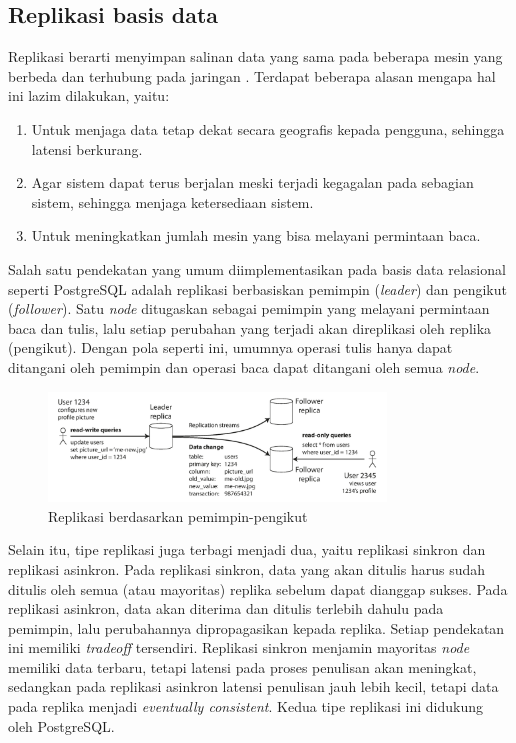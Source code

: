 \subsection{Replikasi basis data}

Replikasi berarti menyimpan salinan data yang sama pada beberapa mesin yang berbeda dan terhubung pada jaringan \parencite{dataIntensiveApplications}. Terdapat beberapa alasan mengapa hal ini lazim dilakukan, yaitu:

\begin{enumerate}
    \item Untuk menjaga data tetap dekat secara geografis kepada pengguna, sehingga latensi berkurang.
    \item Agar sistem dapat terus berjalan meski terjadi kegagalan pada sebagian sistem, sehingga menjaga ketersediaan sistem.
    \item Untuk meningkatkan jumlah mesin yang bisa melayani permintaan baca.
\end{enumerate}

Salah satu pendekatan yang umum diimplementasikan pada basis data relasional seperti PostgreSQL adalah replikasi berbasiskan pemimpin (\textit{leader}) dan pengikut (\textit{follower}). Satu \textit{node} ditugaskan sebagai pemimpin yang melayani permintaan baca dan tulis, lalu setiap perubahan yang terjadi akan direplikasi oleh replika (pengikut). Dengan pola seperti ini, umumnya operasi tulis hanya dapat ditangani oleh pemimpin dan operasi baca dapat ditangani oleh semua \textit{node}.

\begin{figure}[ht]
    \centering
    \includegraphics[width=0.8\textwidth]{resources/chapter-2/leader-based-replication.png}
    \caption{Replikasi berdasarkan pemimpin-pengikut \parencite{dataIntensiveApplications}}
    \label{fig:leader-based-replication}
\end{figure}

Selain itu, tipe replikasi juga terbagi menjadi dua, yaitu replikasi sinkron dan replikasi asinkron. Pada replikasi sinkron, data yang akan ditulis harus sudah ditulis oleh semua (atau mayoritas) replika sebelum dapat dianggap sukses. Pada replikasi asinkron, data akan diterima dan ditulis terlebih dahulu pada pemimpin, lalu perubahannya dipropagasikan kepada replika. Setiap pendekatan ini memiliki \textit{tradeoff} tersendiri. Replikasi sinkron menjamin mayoritas \textit{node} memiliki data terbaru, tetapi latensi pada proses penulisan akan meningkat, sedangkan pada replikasi asinkron latensi penulisan jauh lebih kecil, tetapi data pada replika menjadi \textit{eventually consistent}. Kedua tipe replikasi ini didukung oleh PostgreSQL.
